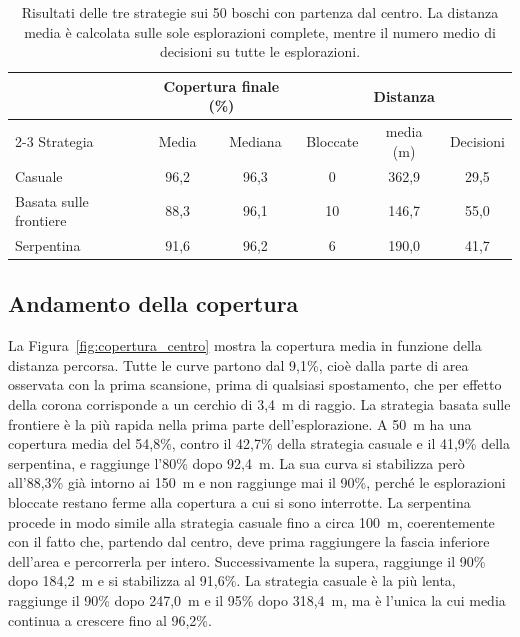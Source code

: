 \begin{table}[!htb]
    \centering
    \small
    \begin{tabular}{@{}lccccc@{}}
        \toprule
        & \multicolumn{2}{c}{Copertura finale (\%)} & & Distanza & \\
        \cmidrule(lr){2-3}
        Strategia & Media & Mediana & Bloccate & media (m) & Decisioni \\
        \midrule
        Casuale & 96,2 & 96,3 & 0 & 362,9 & 29,5 \\
        Basata sulle frontiere & 88,3 & 96,1 & 10 & 146,7 & 55,0 \\
        Serpentina & 91,6 & 96,2 & 6 & 190,0 & 41,7 \\
        \bottomrule
    \end{tabular}
    \caption[Risultati con partenza dal centro]{Risultati delle tre strategie sui 50 boschi con partenza dal centro. La distanza media è calcolata sulle sole esplorazioni complete, mentre il numero medio di decisioni su tutte le esplorazioni.}
    \label{tab:risultati_centro}
\end{table}

\subsection{Andamento della copertura}
\label{sec:andamento}

La Figura~\ref{fig:copertura_centro} mostra la copertura media in funzione della distanza percorsa. Tutte le curve partono dal 9,1\%, cioè dalla parte di area osservata con la prima scansione, prima di qualsiasi spostamento, che per effetto della corona corrisponde a un cerchio di 3,4~m di raggio. La strategia basata sulle frontiere è la più rapida nella prima parte dell'esplorazione. A 50~m ha una copertura media del 54,8\%, contro il 42,7\% della strategia casuale e il 41,9\% della serpentina, e raggiunge l'80\% dopo 92,4~m. La sua curva si stabilizza però all'88,3\% già intorno ai 150~m e non raggiunge mai il 90\%, perché le esplorazioni bloccate restano ferme alla copertura a cui si sono interrotte. La serpentina procede in modo simile alla strategia casuale fino a circa 100~m, coerentemente con il fatto che, partendo dal centro, deve prima raggiungere la fascia inferiore dell'area e percorrerla per intero. Successivamente la supera, raggiunge il 90\% dopo 184,2~m e si stabilizza al 91,6\%. La strategia casuale è la più lenta, raggiunge il 90\% dopo 247,0~m e il 95\% dopo 318,4~m, ma è l'unica la cui media continua a crescere fino al 96,2\%.

